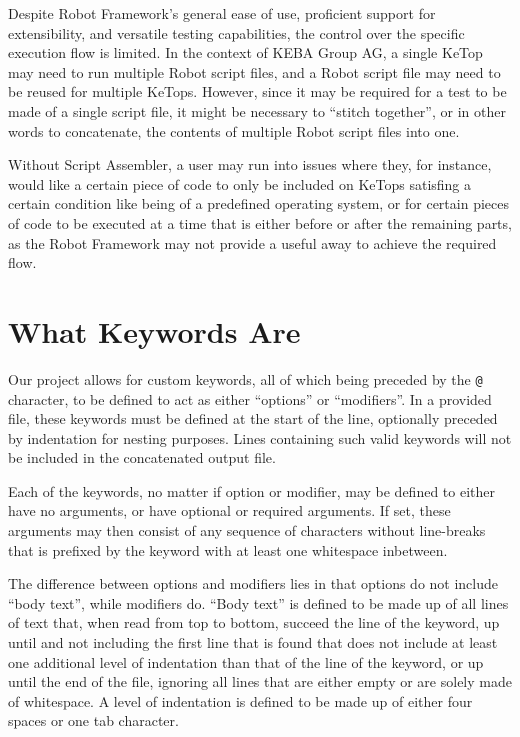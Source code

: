 Despite Robot Framework's general ease of use, proficient support for extensibility, and versatile testing capabilities, the control over the specific execution flow is limited.\cite{robot-framework-pros-cons} In the context of KEBA Group AG, a single KeTop may need to run multiple Robot script files, and a Robot script file may need to be reused for multiple KeTops. However, since it may be required for a test to be made of a single script file, it might be necessary to ``stitch together'', or in other words to concatenate, the contents of multiple Robot script files into one. 

Without Script Assembler, a user may run into issues where they, for instance, would like a certain piece of code to only be included on KeTops satisfing a certain condition like being of a predefined operating system, or for certain pieces of code to be executed at a time that is either before or after the remaining parts, as the Robot Framework may not provide a useful away to achieve the required flow. 

\section{What Keywords Are}

Our project allows for custom keywords, all of which being preceded by the \verb|@| character, to be defined to act as either ``options'' or ``modifiers''. In a provided file, these keywords must be defined at the start of the line, optionally preceded by indentation for nesting purposes. Lines containing such valid keywords will not be included in the concatenated output file. 

Each of the keywords, no matter if option or modifier, may be defined to either have no arguments, or have optional or required arguments. If set, these arguments may then consist of any sequence of characters without line-breaks that is prefixed by the keyword with at least one whitespace inbetween. 

The difference between options and modifiers lies in that options do not include ``body text'', while modifiers do. ``Body text'' is defined to be made up of all lines of text that, when read from top to bottom, succeed the line of the keyword, up until and not including the first line that is found that does not include at least one additional level of indentation than that of the line of the keyword, or up until the end of the file, ignoring all lines that are either empty or are solely made of whitespace. A level of indentation is defined to be made up of either four spaces or one tab character. 

